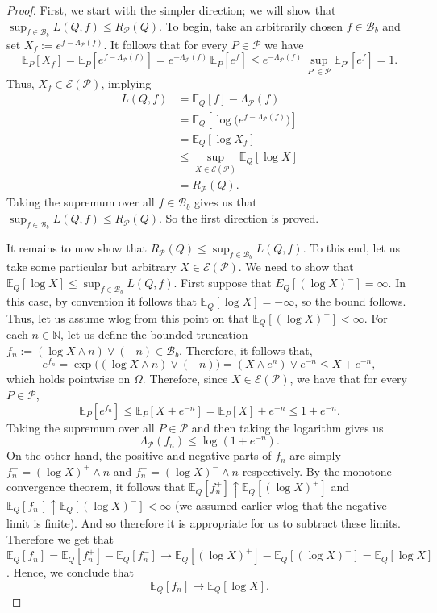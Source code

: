 \documentclass[11pt]{article}
\newcommand{\E}{\mathbb{E}}
\newcommand{\Bb}{\mathcal{B}_b}
\theoremstyle{definition}
\theoremstyle{definition}
\begin{document}
\begin{proof}
First, we start with the simpler direction; we will show that $\sup_{f\in\Bb}L(Q,f)\le R_{\mathcal P}(Q)$. To begin, take an arbitrarily chosen $f\in\Bb$ and set $X_f:=e^{f-\Lambda_{\mathcal P}(f)}$. It follows that for every $P\in\mathcal P$ we have 
\[
\E_P[X_f]=\E_P\left[e^{f-\Lambda_{\mathcal{P}}(f)}\right] = e^{-\Lambda_{\mathcal{P}}(f)}\, \E_P[e^f]\le e^{-\Lambda_{\mathcal{P}}(f)}\, \sup_{P'\in\mathcal{P}} \E_{P'}[e^f]=1.
\]
Thus, $X_f\in\mathcal E(\mathcal P)$, implying 
\begin{align*}
L(Q,f)&=\E_{Q}[f]-\Lambda_{\mathcal{P}}(f)\\
&=\E_{Q}\left[\log\bigl(e^{f-\Lambda_{\mathcal{P}}(f)}\bigr)\right]\\
&=\E_{Q}[\log X_f]\\
&\le \sup_{X\in\mathcal{E}(\mathcal{P})} \E_{Q}[\log X]\\
&=R_{\mathcal{P}}(Q).
\end{align*}
Taking the supremum over all $f\in\Bb$ gives us that $\sup_{f\in\Bb}L(Q,f)\le R_{\mathcal P}(Q)$. So the first direction is proved. 

It remains to now show that $R_{\mathcal{P}}(Q)\le \sup_{f\in\Bb}L(Q,f)$. To this end, let us take some particular but arbitrary $X\in\mathcal E(\mathcal P)$. We need to show that $\E_{Q}[\log X]\le \sup_{f\in\Bb}L(Q,f)$. First suppose that $E_Q[(\log X)^-]=\infty$. In this case, by convention it follows that $\E_{Q}[\log X]=-\infty$, so the bound follows. Thus, let us assume wlog from this point on that $\E_{Q}[(\log X)^-]<\infty$. For each $n\in\mathbb N$, let us define the bounded truncation $f_n:=(\log X\wedge n)\vee (-n)\in\Bb$. Therefore, it follows that,
\[
e^{f_n}=\exp\bigl((\log X\wedge n)\vee(-n)\bigr)=(X\wedge e^n)\vee e^{-n}\le X+e^{-n},
\]
which holds pointwise on $\Omega$. Therefore, since $X\in\mathcal E(\mathcal P)$, we have that for every $P\in\mathcal P$, 
\[
\E_P[e^{f_n}]\le \E_P[X+e^{-n}] = \E_P[X]+e^{-n}\le 1 +e^{-n}.
\]
Taking the supremum over all $P\in\mathcal P$ and then taking the logarithm gives us
\begin{equation}\label{eq:Lambda-bound}
\Lambda_{\mathcal P}(f_n)\le \log(1+e^{-n}).    
\end{equation}
On the other hand, the positive and negative parts of $f_n$ are simply $f_n^+=(\log X)^+\wedge n$ and $f_n^-=(\log X)^-\wedge n$ respectively. By the monotone convergence theorem, it follows that $\E_{Q}[f_n^+]\uparrow\E_{Q}[(\log X)^+]$ and $\E_{Q}[f_n^-]\uparrow\E_{Q}[(\log X)^-]<\infty$ (we assumed earlier wlog that the negative limit is finite). And so therefore it is appropriate for us to subtract these limits. Therefore we get that $\E_{Q}[f_n]=\E_{Q}[f_n^+]-\E_{Q}[f_n^-]\to \E_{Q}[(\log X)^+]-\E_{Q}[(\log X)^-]=\E_{Q}[\log X]$. Hence, we conclude that
\begin{equation}\label{eq:fn-to-logX}
\E_{Q}[f_n] \longrightarrow \E_{Q}[\log X].    
\end{equation}


\end{proof}
\end{document}
